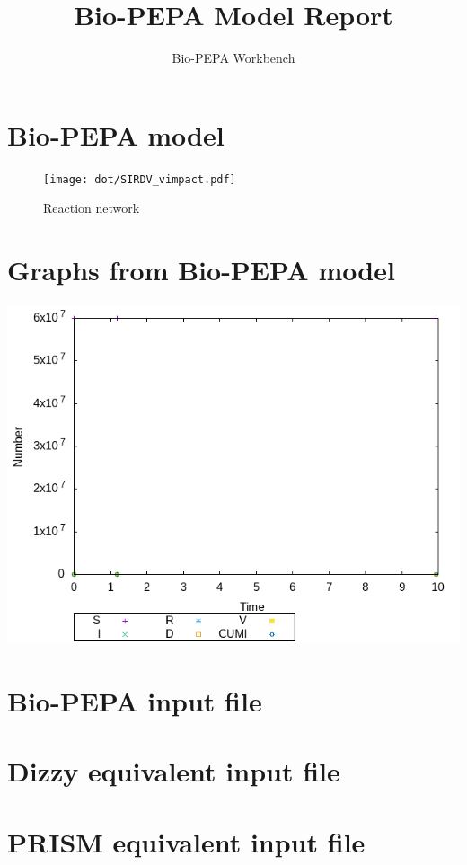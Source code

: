 \documentclass{llncs}
\title{Bio-PEPA Model Report}
\author{Bio-PEPA Workbench}
\institute{\today}
\begin{document}
\maketitle
\section{Bio-PEPA model}

\begin{figure}[htbp]
\begin{center}
\texttt{[image: dot/SIRDV\_vimpact.pdf]}
\caption{Reaction network}
\end{center}
\end{figure}
\newpage
\section{Graphs from Bio-PEPA model}
\includegraphics[scale=1]{png/SIRDV_vimpact001_stochkit_results_0}
\appendix
\newpage
\section{Bio-PEPA input file}

\newpage
\section{Dizzy equivalent input file}

\newpage
\section{PRISM equivalent input file}

\end{document}
